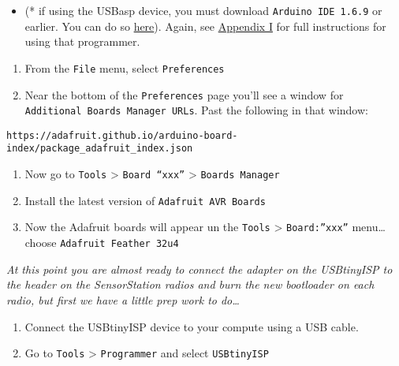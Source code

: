 \documentclass[
]{article}
\providecommand{\tightlist}{%
  \setlength{\itemsep}{0pt}\setlength{\parskip}{0pt}}
\begin{document}
\begin{itemize}
\tightlist
\item
  (* if using the USBasp device, you must download
  \texttt{Arduino\ IDE\ 1.6.9} or earlier. You can do so
  \href{https://www.arduino.cc/en/main/OldSoftwareReleases}{here}).
  Again, see \protect\hyperlink{Appendix_I}{Appendix I} for full
  instructions for using that programmer.
\end{itemize}

\begin{enumerate}
\def\labelenumi{\arabic{enumi}.}
\setcounter{enumi}{4}
\tightlist
\item
  From the \texttt{File} menu, select \texttt{Preferences}
\item
  Near the bottom of the \texttt{Preferences} page you'll see a window
  for \texttt{Additional\ Boards\ Manager\ URLs}. Past the following in
  that window:
\end{enumerate}

\begin{verbatim}
https://adafruit.github.io/arduino-board-index/package_adafruit_index.json
\end{verbatim}

\begin{enumerate}
\def\labelenumi{\arabic{enumi}.}
\setcounter{enumi}{4}
\item
  Now go to \texttt{Tools} \textgreater{} \texttt{Board\ “xxx”}
  \textgreater{} \texttt{Boards\ Manager}
\item
  Install the latest version of \texttt{Adafruit\ AVR\ Boards}
\item
  Now the Adafruit boards will appear un the \texttt{Tools}
  \textgreater{} \texttt{Board:”xxx”} menu\ldots choose
  \texttt{Adafruit\ Feather\ 32u4}
\end{enumerate}

\emph{At this point you are almost ready to connect the adapter on the
USBtinyISP to the header on the SensorStation radios and burn the new
bootloader on each radio, but first we have a little prep work to
do\ldots{}}

\begin{enumerate}
\def\labelenumi{\arabic{enumi}.}
\setcounter{enumi}{5}
\item
  Connect the USBtinyISP device to your compute using a USB cable.
\item
  Go to \texttt{Tools} \textgreater{} \texttt{Programmer} and select
  \texttt{USBtinyISP}
\end{enumerate}
\end{document}
